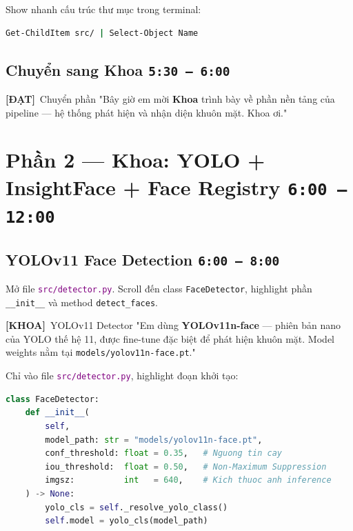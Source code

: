 \documentclass[12pt, a4paper]{article}
\newcommand{\timing}[1]{%
  \hfill\colorbox{NavyBlue!20}{\texttt{\small #1}}%
}
\newcommand{\dat}{\textcolor{BrickRed}{\textbf{[ĐẠT]}}}
\newcommand{\khoa}{\textcolor{OliveGreen}{\textbf{[KHOA]}}}
\newcommand{\fpath}[1]{\texttt{\textcolor{purple}{#1}}}
\begin{document}
\begin{action}
Show nhanh cấu trúc thư mục trong terminal:
\begin{lstlisting}[language=bash]
Get-ChildItem src/ | Select-Object Name
\end{lstlisting}
\end{action}

\subsection{Chuyển sang Khoa \timing{5:30 – 6:00}}

\begin{dialog}{\dat\ Chuyển phần}
"Bây giờ em mời \textbf{Khoa} trình bày về phần nền tảng của pipeline ---
hệ thống phát hiện và nhận diện khuôn mặt.
Khoa ơi."
\end{dialog}

\section{Phần 2 — Khoa: YOLO + InsightFace + Face Registry \timing{6:00 – 12:00}}

\subsection{YOLOv11 Face Detection \timing{6:00 – 8:00}}

\begin{action}
Mở file \fpath{src/detector.py}. Scroll đến class \texttt{FaceDetector},
highlight phần \texttt{\_\_init\_\_} và method \texttt{detect\_faces}.
\end{action}

\begin{dialog}{\khoa\ YOLOv11 Detector}
"Em dùng \textbf{YOLOv11n-face} --- phiên bản nano của YOLO thế hệ 11,
được fine-tune đặc biệt để phát hiện khuôn mặt.
Model weights nằm tại \texttt{models/yolov11n-face.pt}."
\end{dialog}

\begin{action}
Chỉ vào file \fpath{src/detector.py}, highlight đoạn khởi tạo:
\end{action}

\begin{lstlisting}[language=Python, caption={src/detector.py --- Khởi tạo YOLO}]
class FaceDetector:
    def __init__(
        self,
        model_path: str = "models/yolov11n-face.pt",
        conf_threshold: float = 0.35,   # Nguong tin cay
        iou_threshold:  float = 0.50,   # Non-Maximum Suppression
        imgsz:          int   = 640,    # Kich thuoc anh inference
    ) -> None:
        yolo_cls = self._resolve_yolo_class()
        self.model = yolo_cls(model_path)
\end{lstlisting}
\end{document}

